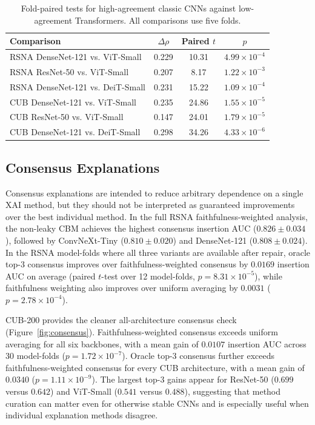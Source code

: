 \documentclass{bmvc2k}
\begin{document}
\begin{table}[t]
\centering
\small
\begin{tabular}{lccc}
\toprule
Comparison & $\Delta\rho$ & Paired $t$ & $p$\\
\midrule
RSNA DenseNet-121 vs. ViT-Small & 0.229 & 10.31 & $4.99{\times}10^{-4}$\\
RSNA ResNet-50 vs. ViT-Small & 0.207 & 8.17 & $1.22{\times}10^{-3}$\\
RSNA DenseNet-121 vs. DeiT-Small & 0.231 & 15.22 & $1.09{\times}10^{-4}$\\
CUB DenseNet-121 vs. ViT-Small & 0.235 & 24.86 & $1.55{\times}10^{-5}$\\
CUB ResNet-50 vs. ViT-Small & 0.147 & 24.01 & $1.79{\times}10^{-5}$\\
CUB DenseNet-121 vs. DeiT-Small & 0.298 & 34.26 & $4.33{\times}10^{-6}$\\
\bottomrule
\end{tabular}
\caption{Fold-paired tests for high-agreement classic CNNs against low-agreement Transformers. All comparisons use five folds.}
\label{tab:stats}
\end{table}

\subsection{Consensus Explanations}

Consensus explanations are intended to reduce arbitrary dependence on a single XAI method, but they should not be interpreted as guaranteed improvements over the best individual method. In the full RSNA faithfulness-weighted analysis, the non-leaky CBM achieves the highest consensus insertion AUC ($0.826\pm0.034$), followed by ConvNeXt-Tiny ($0.810\pm0.020$) and DenseNet-121 ($0.808\pm0.024$). In the RSNA model-folds where all three variants are available after repair, oracle top-$3$ consensus improves over faithfulness-weighted consensus by $0.0169$ insertion AUC on average (paired $t$-test over 12 model-folds, $p=8.31{\times}10^{-5}$), while faithfulness weighting also improves over uniform averaging by $0.0031$ ($p=2.78{\times}10^{-4}$).

CUB-200 provides the cleaner all-architecture consensus check (Figure~\ref{fig:consensus}). Faithfulness-weighted consensus exceeds uniform averaging for all six backbones, with a mean gain of $0.0107$ insertion AUC across 30 model-folds ($p=1.72{\times}10^{-7}$). Oracle top-$3$ consensus further exceeds faithfulness-weighted consensus for every CUB architecture, with a mean gain of $0.0340$ ($p=1.11{\times}10^{-9}$). The largest top-$3$ gains appear for ResNet-50 ($0.699$ versus $0.642$) and ViT-Small ($0.541$ versus $0.488$), suggesting that method curation can matter even for otherwise stable CNNs and is especially useful when individual explanation methods disagree.
\end{document}
